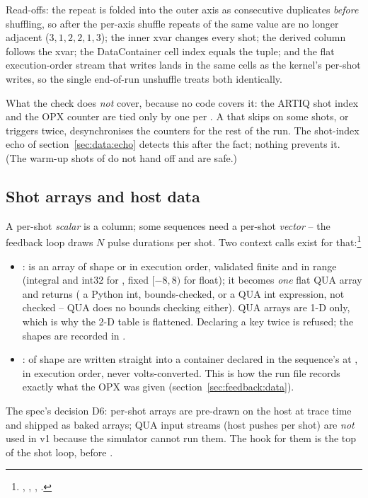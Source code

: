 Read-offs: the repeat is folded into the outer axis as consecutive
duplicates \emph{before} shuffling, so after the per-axis shuffle repeats of
the same value are no longer adjacent ($3, 1, 2, 2, 1, 3$); the inner xvar
changes every shot; the derived column follows the xvar; the DataContainer
cell index equals the  tuple; and the flat execution-order
stream that  writes lands in the same cells as the
kernel's per-shot writes, so the single end-of-run unshuffle treats both
identically.

What the check does \emph{not} cover, because no code covers it: the ARTIQ
shot index and the OPX  counter are tied only by one
 per . A  that
skips  on some shots, or triggers twice,
desynchronises the counters for the rest of the run. The shot-index echo of
section~\ref{sec:data:echo} detects this after the fact; nothing prevents
it. (The warm-up shots of  do not hand off and are safe.)

\subsection{Shot arrays and host data}
\label{sec:xvars:shotarrays}

A per-shot \emph{scalar} is a column; some sequences need a per-shot
\emph{vector} -- the feedback loop draws $N$ pulse durations per shot. Two
context calls exist for that:\footnote{, ,
, .}

\begin{itemize}[nosep]
  \item {}:  is an
    array of shape  or  in execution
    order, validated finite and in range (integral and int32 for
    , fixed $[-8, 8)$ for float); it becomes \emph{one} flat
    QUA array and  returns  ( a Python int, bounds-checked, or a QUA int expression, not
    checked -- QUA does no bounds checking either). QUA arrays are 1-D only,
    which is why the 2-D table is flattened. Declaring a key twice is
    refused; the shapes are recorded in .
  \item {}:  of shape
     are written straight into a container declared
    in the sequence's  at , in
    execution order, never volts-converted. This is how the run file records
    exactly what the OPX was given (section~\ref{sec:feedback:data}).
\end{itemize}

The spec's decision D6: per-shot arrays are pre-drawn on the host at trace
time and shipped as baked arrays; QUA input streams (host pushes per shot)
are \emph{not} used in v1 because the simulator cannot run them. The hook
for them is the top of the shot loop, before .
